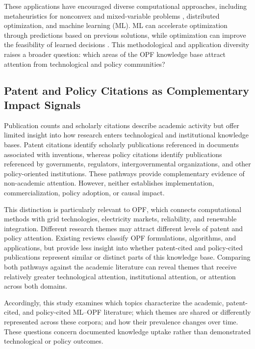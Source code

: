\documentclass[a4paper,fleqn]{cas-sc}
\begin{document}
These applications have encouraged diverse computational approaches, including metaheuristics for nonconvex and mixed-variable problems \cite{papadimitrakis2021metaheuristic}, distributed optimization, and machine learning (ML). ML can accelerate optimization through predictions based on previous solutions, while optimization can improve the feasibility of learned decisions \cite{steven2026machine}. This methodological and application diversity raises a broader question: which areas of the OPF knowledge base attract attention from technological and policy communities?

\subsection{Patent and Policy Citations as Complementary Impact Signals}

Publication counts and scholarly citations describe academic activity but offer limited insight into how research enters technological and institutional knowledge bases. Patent citations identify scholarly publications referenced in documents associated with inventions, whereas policy citations identify publications referenced by governments, regulators, intergovernmental organizations, and other policy-oriented institutions. These pathways provide complementary evidence of non-academic attention. However, neither establishes implementation, commercialization, policy adoption, or causal impact.

This distinction is particularly relevant to OPF, which connects computational methods with grid technologies, electricity markets, reliability, and renewable integration. Different research themes may attract different levels of patent and policy attention. Existing reviews classify OPF formulations, algorithms, and applications, but provide less insight into whether patent-cited and policy-cited publications represent similar or distinct parts of this knowledge base. Comparing both pathways against the academic literature can reveal themes that receive relatively greater technological attention, institutional attention, or attention across both domains.

Accordingly, this study examines which topics characterize the academic, patent-cited, and policy-cited ML--OPF literature; which themes are shared or differently represented across these corpora; and how their prevalence changes over time. These questions concern documented knowledge uptake rather than demonstrated technological or policy outcomes.
\end{document}
